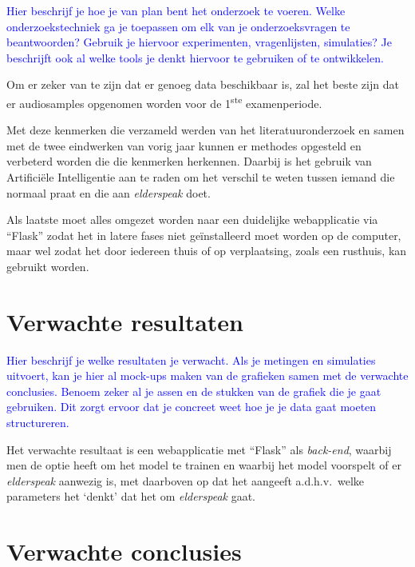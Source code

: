 \textcolor{blue}{Hier beschrijf je hoe je van plan bent het onderzoek te voeren. Welke onderzoekstechniek ga je toepassen om elk van je onderzoeksvragen te beantwoorden? Gebruik je hiervoor experimenten, vragenlijsten, simulaties? Je beschrijft ook al welke tools je denkt hiervoor te gebruiken of te ontwikkelen.}

Om er zeker van te zijn dat er genoeg data beschikbaar is, zal het beste zijn dat er audiosamples opgenomen worden voor de 1\textsuperscript{ste} examenperiode.

Met deze kenmerken die verzameld werden van het literatuuronderzoek en samen met de twee eindwerken van vorig jaar kunnen er methodes opgesteld en verbeterd worden die die kenmerken herkennen.
Daarbij is het gebruik van Artificiële Intelligentie aan te raden om het verschil te weten tussen iemand die normaal praat en die aan \textit{elderspeak} doet.

Als laatste moet alles omgezet worden naar een duidelijke webapplicatie via ``Flask'' zodat het in latere fases niet geïnstalleerd moet worden op de computer, maar wel zodat het door iedereen thuis of op verplaatsing, zoals een rusthuis, kan gebruikt worden.


\section{Verwachte resultaten}
\label{sec:verwachte_resultaten}

\textcolor{blue}{Hier beschrijf je welke resultaten je verwacht. Als je metingen en simulaties uitvoert, kan je hier al mock-ups maken van de grafieken samen met de verwachte conclusies. Benoem zeker al je assen en de stukken van de grafiek die je gaat gebruiken. Dit zorgt ervoor dat je concreet weet hoe je je data gaat moeten structureren.}

Het verwachte resultaat is een webapplicatie met ``Flask'' als \textit{back-end}, waarbij men de optie heeft om het model te trainen en waarbij het model voorspelt of er \textit{elderspeak} aanwezig is, met daarboven op dat het aangeeft a.d.h.v.\ welke parameters het `denkt' dat het om \textit{elderspeak} gaat.


\section{Verwachte conclusies}
\label{sec:verwachte_conclusies}

